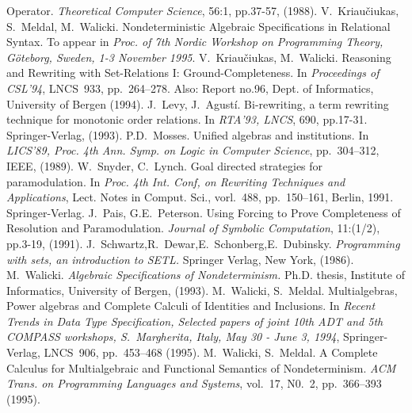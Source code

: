 \begin{thebibliography}{MM99}
   Operator. {\it Theoretical Computer Science}, 56:1, pp.37-57, (1988).
V.~Kriau\v ciukas, S.~Meldal, M.~Walicki.
   Nondeterministic Algebraic Specifications in Relational Syntax. To appear
   in {\it Proc. of 7th Nordic Workshop on Programming Theory, G\"oteborg,
   Sweden, 1-3 November 1995}.
 V.~Kriau\v ciukas, M.~Walicki.  Reasoning and Rewriting
   with Set-Relations I: Ground-Completeness.  In {\it Proceedings of
   CSL'94}, LNCS~933, pp.~264--278. Also: Report no.96, Dept. of Informatics,
   University of Bergen (1994).
 J.~Levy, J.~Agust\'i. Bi-rewriting, a term rewriting
   technique for monotonic order relations. In {\it RTA'93, LNCS}, 
   690, pp.17-31. Springer-Verlag, (1993).
 P.D.~Mosses. Unified algebras and institutions. In
   {\it LICS'89, Proc. 4th Ann. Symp. on Logic in Computer Science},
   pp.~304--312, IEEE, (1989).
 W.~Snyder, C.~Lynch. Goal directed strategies for
   paramodulation. In {\it Proc. 4th Int. Conf, on Rewriting Techniques and
   Applications}, Lect. Notes in Comput. Sci., vorl.~488, pp.~150--161,
   Berlin, 1991. Springer-Verlag.
 J.~Pais, G.E.~Peterson. Using Forcing to Prove Completeness
   of Resolution and Paramodulation. {\it Journal of Symbolic Computation}, 
   11:(1/2), pp.3-19, (1991).
 J.~Schwartz,R.~Dewar,E.~Schonberg,E.~Dubinsky. 
   {\it Programming with sets, an introduction to SETL. }
   Springer Verlag, New York, (1986).
 M.~Walicki. 
   {\it Algebraic Specifications of Nondeterminism.}
   Ph.D. thesis, Institute of Informatics, University of Bergen, (1993).
 M.~Walicki, S.~Meldal. Multialgebras, Power algebras
   and Complete Calculi of Identities and Inclusions. In {\it Recent Trends
   in Data Type Specification, Selected papers of joint 10th ADT and 5th
   COMPASS workshops, S.~Margherita, Italy, May 30 - June 3, 1994},
   Springer-Verlag, LNCS~906, pp.~453--468 (1995).
 M.~Walicki, S.~Meldal. A Complete Calculus for 
   Multialgebraic and Functional Semantics of Nondeterminism. 
   {\it ACM Trans. on Programming Languages and Systems}, vol.~17, N0.~2,
   pp.~366--393 (1995).
\end{thebibliography} 

